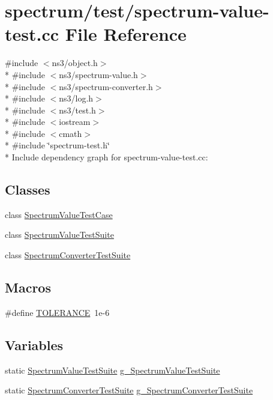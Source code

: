 \hypertarget{spectrum-value-test_8cc}{}\section{spectrum/test/spectrum-\/value-\/test.cc File Reference}
\label{spectrum-value-test_8cc}
{\ttfamily \#include $<$ns3/object.\+h$>$}\\*
{\ttfamily \#include $<$ns3/spectrum-\/value.\+h$>$}\\*
{\ttfamily \#include $<$ns3/spectrum-\/converter.\+h$>$}\\*
{\ttfamily \#include $<$ns3/log.\+h$>$}\\*
{\ttfamily \#include $<$ns3/test.\+h$>$}\\*
{\ttfamily \#include $<$iostream$>$}\\*
{\ttfamily \#include $<$cmath$>$}\\*
{\ttfamily \#include \char`\"{}spectrum-\/test.\+h\char`\"{}}\\*
Include dependency graph for spectrum-\/value-\/test.cc\+:
\subsection*{Classes}
\begin{DoxyCompactItemize}
\item 
class \hyperlink{classSpectrumValueTestCase}{Spectrum\+Value\+Test\+Case}
\item 
class \hyperlink{classSpectrumValueTestSuite}{Spectrum\+Value\+Test\+Suite}
\item 
class \hyperlink{classSpectrumConverterTestSuite}{Spectrum\+Converter\+Test\+Suite}
\end{DoxyCompactItemize}
\subsection*{Macros}
\begin{DoxyCompactItemize}
\item 
\#define \hyperlink{spectrum-value-test_8cc_a30c17564229ec2e37dfea9c6c9ad643e}{T\+O\+L\+E\+R\+A\+N\+CE}~1e-\/6
\end{DoxyCompactItemize}
\subsection*{Variables}
\begin{DoxyCompactItemize}
\item 
static \hyperlink{classSpectrumValueTestSuite}{Spectrum\+Value\+Test\+Suite} \hyperlink{spectrum-value-test_8cc_ac71688fc347b4e4a89271765502afc63}{g\+\_\+\+Spectrum\+Value\+Test\+Suite}
\item 
static \hyperlink{classSpectrumConverterTestSuite}{Spectrum\+Converter\+Test\+Suite} \hyperlink{spectrum-value-test_8cc_aa7fdc16769dd5606200fa9461dfd920e}{g\+\_\+\+Spectrum\+Converter\+Test\+Suite}
\end{DoxyCompactItemize}


